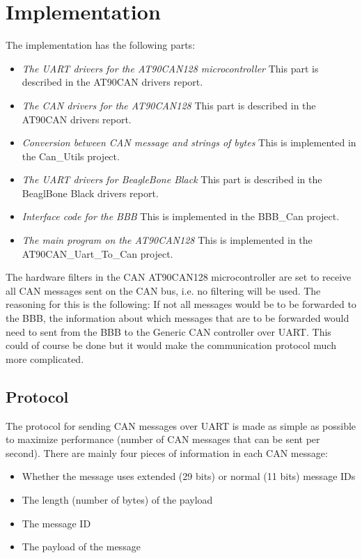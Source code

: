 
\section{Implementation}\label{sec:implementation}
The implementation has the following parts:

\begin{itemize}
   \item { \em The UART drivers for the AT90CAN128 microcontroller} \newline This part is described in the AT90CAN drivers report.
   \item { \em The CAN drivers for the AT90CAN128} \newline This part is described in the AT90CAN drivers report.
   \item { \em Conversion between CAN message and strings of bytes } \newline This is implemented in the Can\_Utils project.
   \item { \em The UART drivers for BeagleBone Black} \newline This part is described in the BeaglBone Black drivers report.
   \item { \em Interface code for the BBB} \newline This is implemented in the BBB\_Can project.
   \item { \em The main program on the AT90CAN128} \newline This is implemented in the AT90CAN\_Uart\_To\_Can project.
\end{itemize}

The hardware filters in the CAN AT90CAN128 microcontroller are set to receive all CAN messages sent on the CAN bus, i.e. no filtering will be used. The reasoning for this is the following: 
If not all messages would be to be forwarded to the BBB, the information about which messages that are to be forwarded would need to sent from the BBB to the Generic CAN controller over UART. This could of course be done but it would make the communication protocol much more complicated.


\subsection{Protocol}
The protocol for sending CAN messages over UART is made as simple as possible to maximize performance (number of CAN messages that can be sent per second). There are mainly four pieces of information in each CAN message: 
\begin{itemize}
   \item { Whether the message uses extended (29 bits) or normal (11 bits) message IDs} 
   \item { The length (number of bytes) of the payload} 
   \item { The message ID}
   \item { The payload of the message}
\end{itemize}

